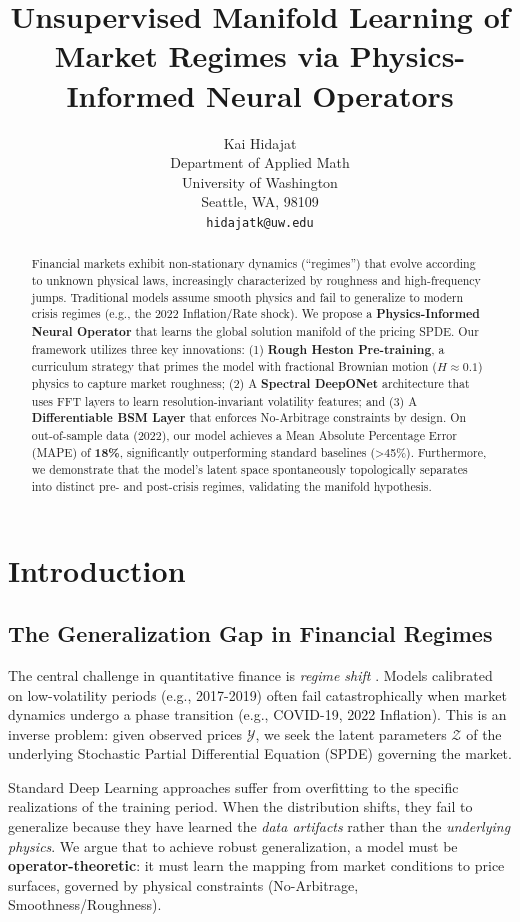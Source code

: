 \documentclass{article}
\title{Unsupervised Manifold Learning of Market Regimes via Physics-Informed Neural Operators}
\author{%
  Kai Hidajat \\
  Department of Applied Math \\
  University of Washington \\
  Seattle, WA, 98109\\
  \texttt{hidajatk@uw.edu} \\
}
\begin{document}
\maketitle

\begin{abstract}
    Financial markets exhibit non-stationary dynamics (``regimes'') that evolve according to unknown physical laws, increasingly characterized by roughness and high-frequency jumps. Traditional models assume smooth physics and fail to generalize to modern crisis regimes (e.g., the 2022 Inflation/Rate shock). We propose a \textbf{Physics-Informed Neural Operator} that learns the global solution manifold of the pricing SPDE. Our framework utilizes three key innovations: (1) \textbf{Rough Heston Pre-training}, a curriculum strategy that primes the model with fractional Brownian motion (\(H\approx 0.1\)) physics to capture market roughness; (2) A \textbf{Spectral DeepONet} architecture that uses FFT layers to learn resolution-invariant volatility features; and (3) A \textbf{Differentiable BSM Layer} that enforces No-Arbitrage constraints by design. On out-of-sample data (2022), our model achieves a Mean Absolute Percentage Error (MAPE) of \textbf{18\%}, significantly outperforming standard baselines (>45\%). Furthermore, we demonstrate that the model's latent space spontaneously topologically separates into distinct pre- and post-crisis regimes, validating the manifold hypothesis.
\end{abstract}

\section{Introduction}

\subsection{The Generalization Gap in Financial Regimes}
The central challenge in quantitative finance is \emph{regime shift} \citep{hamilton1989}. Models calibrated on low-volatility periods (e.g., 2017-2019) often fail catastrophically when market dynamics undergo a phase transition (e.g., COVID-19, 2022 Inflation). This is an inverse problem: given observed prices \(\mathcal{Y}\), we seek the latent parameters \(\mathcal{Z}\) of the underlying Stochastic Partial Differential Equation (SPDE) governing the market.

Standard Deep Learning approaches suffer from overfitting to the specific realizations of the training period. When the distribution shifts, they fail to generalize because they have learned the \emph{data artifacts} rather than the \emph{underlying physics}. We argue that to achieve robust generalization, a model must be \textbf{operator-theoretic}: it must learn the mapping from market conditions to price surfaces, governed by physical constraints (No-Arbitrage, Smoothness/Roughness).
\end{document}

